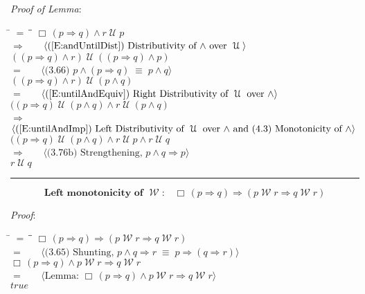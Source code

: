 \documentclass[12pt, fleqn, leqno]{article}
\newcommand{\lgap}{2pt}                             %
\newcommand{\mymathindent}{24pt}                    %
\newcommand{\equivs}{\ensuremath{\;\equiv\;}}       %
\newcommand{\impl}{\ensuremath{\Rightarrow}}        %
\newcommand{\Until}{\;\mathcal{U}\;}
\newcommand{\Wait}{\;\mathcal{W}\;}
\newcommand{\Always}{\Box\,}
\newcommand{\myqed}{\rule[-.23ex]{1.2ex}{2.0ex}}
\newcommand{\myqedtab}{\hspace{384pt}}              %
\newcommand{\Gll} {\langle}                         %
\newcommand{\Ggg} {\rangle}                         %
\newcommand{\Hint}[1]     {\ \ \ $\Gll              \mbox{#1} \Ggg$ }   %
\begin{document}
\emph{Proof of Lemma}:
\begin{tabbing}
\hspace{\mymathindent} \= $= \;$ \= \myqedtab \= \kill
  \> \>   $\Always (p \impl q) \land r \Until p$\\[\lgap]
  \> $\impl$  \>  \Hint{(\ref{E:andUntilDist}) Distributivity of $\land$ over $\Until$}\\[\lgap]
  \> \>   $((p \impl q) \land r) \Until ((p \impl q) \land p)$\\[\lgap]
  \> $=$  \>  \Hint{(3.66) $p\land (p \impl q) \equivs  p \land q$}\\[\lgap]
  \> \>   $((p \impl q) \land r) \Until (p \land q)$\\[\lgap]
  \> $=$  \>  \Hint{(\ref{E:untilAndEquiv}) Right Distributivity of $\Until$ over $\land$}\\[\lgap]
  \> \>   $((p \impl q) \Until (p \land q) \land r \Until (p \land q)$\\[\lgap]
  \> $\impl$  \>  \Hint{(\ref{E:untilAndImp}) Left Distributivity of $\Until$ over $\land$ and (4.3) Monotonicity of $\land$}\\[\lgap]
  \> \>   $((p \impl q) \Until (p \land q) \land r \Until p \land r \Until q$\\[\lgap]
  \> $\impl$ \> \Hint{(3.76b) Strengthening, $p\land q \impl p$} \\[\lgap]
  \> \>   $r \Until q$ \quad \myqed
\end{tabbing}
\begin{equation}\label{E:leftMonoWait}
\textbf{Left monotonicity of $\Wait$:}\quad \Always (p \impl q) \impl (p \Wait r \impl q \Wait r)
\end{equation}

\emph{Proof}:
\begin{tabbing}
\hspace{\mymathindent} \= $= \;$ \= \myqedtab \= \kill
  \> \>   $\Always (p \impl q) \impl (p \Wait r \impl q \Wait r)$\\[\lgap]
  \> $=$  \>  \Hint{(3.65) Shunting, $p\land q \impl r \equivs p \impl (q \impl r)$}\\[\lgap]
  \> \>   $\Always (p \impl q) \land p \Wait r \impl q \Wait r$\\[\lgap]
  \> $=$  \>  \Hint{Lemma: $\Always (p \impl q) \land p \Wait r \impl q \Wait r$}\\[\lgap]
  \> \>   $true$
\end{tabbing}
\end{document}
